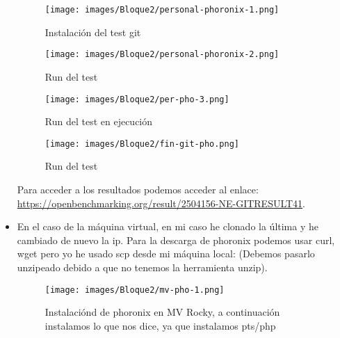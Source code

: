 \begin{itemize}
    \begin{figure}[H]
        \centering
        \begin{minipage}{0.45\textwidth}
            \centering
            \texttt{[image: images/Bloque2/personal-phoronix-1.png]}
            \caption{Instalación del test git}
            \label{fig:image1}
        \end{minipage}
        \hfill
        \begin{minipage}{0.45\textwidth}
            \centering
            \texttt{[image: images/Bloque2/personal-phoronix-2.png]}
            \caption{Run del test}
            \label{fig:image2}
        \end{minipage}
    \end{figure}
    \begin{figure}[H]
        \centering
        \begin{minipage}{0.45\textwidth}
            \centering
            \texttt{[image: images/Bloque2/per-pho-3.png]}
            \caption{Run del test en ejecución}
            \label{fig:image5}
        \end{minipage}
        \hfill
        \begin{minipage}{0.45\textwidth}
            \centering
            \texttt{[image: images/Bloque2/fin-git-pho.png]}
            \caption{Run del test}
            \label{fig:image6}
        \end{minipage}
    \end{figure}
    Para acceder a los resultados podemos acceder al enlace: \url{https://openbenchmarking.org/result/2504156-NE-GITRESULT41}.
    \item En el caso de la máquina virtual, en mi caso he clonado la última y he cambiado de nuevo la ip. Para la descarga de phoronix podemos usar curl, wget pero yo he usado scp desde mi máquina local:  (Debemos pasarlo unzipeado debido a que no tenemos la herramienta unzip).
    \begin{figure}[H]
        \centering
        \begin{minipage}{0.45\textwidth}
            \centering
            \texttt{[image: images/Bloque2/mv-pho-1.png]}
            \caption{Instalaciónd de phoronix en MV Rocky, a continuación instalamos lo que nos dice, ya que instalamos pts/php}
            \label{fig:image7}
        \end{minipage}

\end{figure}
\end{itemize}
